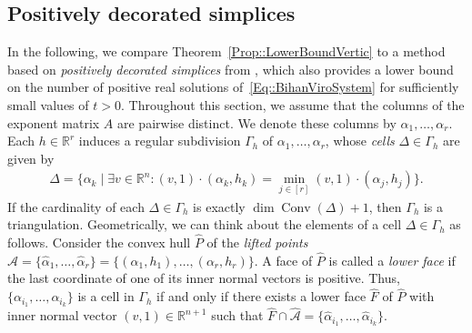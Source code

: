 \documentclass{article}
\theoremstyle{definition}
\DeclareMathOperator{\Conv}{Conv}
\begin{document}
\subsection{Positively decorated simplices}


In the following, we compare Theorem~\ref{Prop::LowerBoundVertic} to a method based on \emph{positively decorated simplices} from \cite{PolyhedralMethodSparsePositive}, which also provides a lower bound on the number of positive real solutions of~\eqref{Eq::BihanViroSystem} for sufficiently small values of $t>0$. Throughout this section, we assume that the columns of the exponent matrix $A$ are pairwise distinct. We denote these columns by $\alpha_1, \dots, \alpha_r$. Each $h \in \mathbb{R}^r$ induces a regular subdivision $\Gamma_h$ of $\alpha_1, \dots, \alpha_r$, whose \emph{cells} $\Delta \in  \Gamma_h$ are given by
\begin{align}
\label{Eq::DefSimplexMin}
     \Delta = \big\{ \alpha_k \mid \exists v \in \mathbb{R}^n\colon (v,1) \cdot (\alpha_k,h_k) = \min_{j \in [r]} (v,1) \cdot (\alpha_j,h_j) \big\}. 
\end{align}
If the cardinality of each $\Delta \in \Gamma_{h}$ is exactly $\dim \Conv(\Delta ) +1$, then $\Gamma_h$  is a triangulation. Geometrically, we can think about the elements of a cell $\Delta \in \Gamma_h$ as follows. Consider the convex hull $\hat{P}$ of the \emph{lifted points} $\hat{\mathcal{A}} = \{ \hat{\alpha}_1, \dots ,\hat{\alpha}_r\}= \{(\alpha_1,h_1), \dots ,(\alpha_r,h_r) \}$. A face of $\hat{P}$ is called a \emph{lower face} if the last coordinate of one of its inner normal vectors is positive. Thus, $\{\alpha_{i_1}, \dots , \alpha_{i_k}\}$ is a cell in $\Gamma_h$ if and only if there exists a lower face $\hat{F}$ of $\hat{P}$ with inner normal vector $(v,1) \in \mathbb{R}^{n+1}$ such that $\hat{F} \cap \hat{\mathcal{A}} = \{\hat{\alpha}_{i_1}, \dots , \hat{\alpha}_{i_k} \}$.
 
\end{document}
